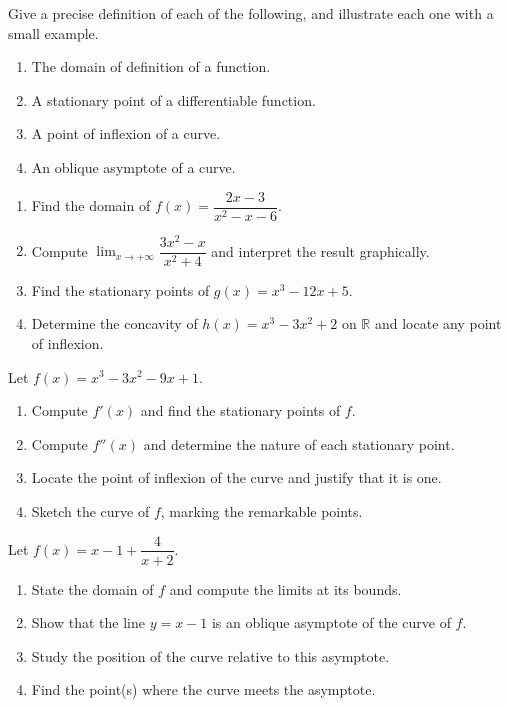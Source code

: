 \documentclass[11pt]{article}
\newcounter{popsec}
\newcounter{popsub}
\newcommand{\courssub}[1]{%
  \stepcounter{popsub}%
  \par\vspace{9pt}\noindent{\popxbold\fontsize{11.5}{13}\selectfont\color{popink}{\color{poporange}\thepopsec.\thepopsub}\hspace{6pt}#1}\par\nopagebreak\vspace{4pt}
}
\begin{document}
\begin{exercice}[Definitions]
Give a precise definition of each of the following, and illustrate each one with a small example.
\begin{enumerate}
\item The domain of definition of a function.
\item A stationary point of a differentiable function.
\item A point of inflexion of a curve.
\item An oblique asymptote of a curve.
\end{enumerate}
\end{exercice}

\begin{exercice}
\begin{enumerate}
\item Find the domain of $f(x)=\dfrac{2x-3}{x^{2}-x-6}$.
\item Compute $\lim_{x\to +\infty}\dfrac{3x^{2}-x}{x^{2}+4}$ and interpret the result graphically.
\item Find the stationary points of $g(x)=x^{3}-12x+5$.
\item Determine the concavity of $h(x)=x^{3}-3x^{2}+2$ on $\mathbb{R}$ and locate any point of inflexion.
\end{enumerate}
\end{exercice}

\courssub{I practise}

\begin{exercice}
Let $f(x)=x^{3}-3x^{2}-9x+1$.
\begin{enumerate}
\item Compute $f'(x)$ and find the stationary points of $f$.
\item Compute $f''(x)$ and determine the nature of each stationary point.
\item Locate the point of inflexion of the curve and justify that it is one.
\item Sketch the curve of $f$, marking the remarkable points.
\end{enumerate}
\end{exercice}

\begin{exercice}
Let $f(x)=x-1+\dfrac{4}{x+2}$.
\begin{enumerate}
\item State the domain of $f$ and compute the limits at its bounds.
\item Show that the line $y=x-1$ is an oblique asymptote of the curve of $f$.
\item Study the position of the curve relative to this asymptote.
\item Find the point(s) where the curve meets the asymptote.
\end{enumerate}
\end{exercice}
\end{document}
